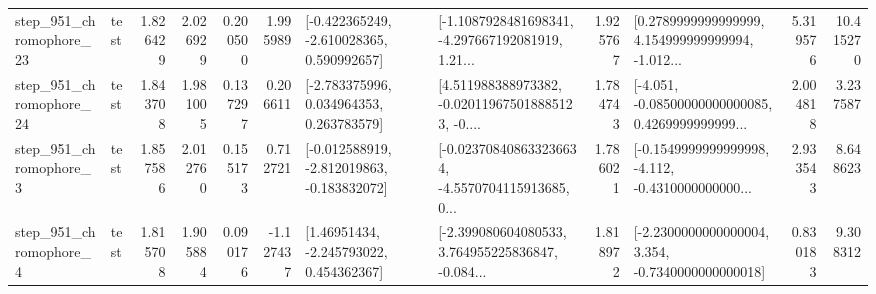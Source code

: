 \begin{tabular}{llrrrrllrlrr}
  step\_951\_chromophore\_23 &      test &      1.826429 &    2.026929 &      0.200500 &  1.995989 &   [-0.422365249, -2.610028365, 0.590992657] &  [-1.1087928481698341, -4.297667192081919, 1.21... &       1.925767 &  [0.2789999999999999, 4.154999999999994, -1.012... &            5.319576 &         10.415270 \\
  step\_951\_chromophore\_24 &      test &      1.843708 &    1.981005 &      0.137297 &  0.206611 &    [-2.783375996, 0.034964353, 0.263783579] &  [4.511988388973382, -0.020119675018885123, -0.... &       1.784743 &  [-4.051, -0.08500000000000085, 0.4269999999999... &            2.004818 &          3.237587 \\
   step\_951\_chromophore\_3 &      test &      1.857586 &    2.012760 &      0.155173 &  0.712721 &  [-0.012588919, -2.812019863, -0.183832072] &  [-0.023708408633236634, -4.5570704115913685, 0... &       1.786021 &  [-0.1549999999999998, -4.112, -0.4310000000000... &            2.933543 &          8.648623 \\
   step\_951\_chromophore\_4 &      test &      1.815708 &    1.905884 &      0.090176 & -1.127437 &     [1.46951434, -2.245793022, 0.454362367] &  [-2.399080604080533, 3.764955225836847, -0.084... &       1.818972 &  [-2.2300000000000004, 3.354, -0.7340000000000018] &            0.830183 &          9.308312 \\
\bottomrule
\end{tabular}


